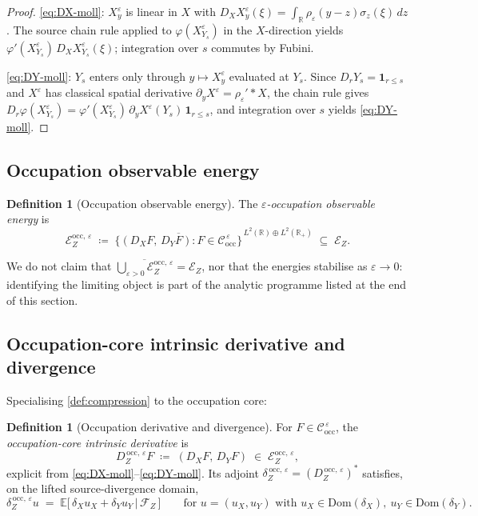 \documentclass[11pt,reqno]{amsart}
\theoremstyle{plain}
\theoremstyle{definition}
\newtheorem{definition}[theorem]{Definition}
\theoremstyle{remark}
\newcommand{\R}{\mathbb{R}}
\newcommand{\E}{\mathbb{E}}
\newcommand{\Dom}{\mathrm{Dom}}
\newcommand{\Energy}{\mathcal{E}}
\newcommand{\IBM}{Z}
\begin{document}
\begin{proof}
\eqref{eq:DX-moll}: $X^\varepsilon_y$ is linear in $X$ with
$D_XX^\varepsilon_y(\xi)=\int_\R\rho_\varepsilon(y-z)\sigma_z(\xi)\,dz$.
The source chain rule applied to $\varphi(X^\varepsilon_{Y_s})$ in the
$X$-direction yields $\varphi'(X^\varepsilon_{Y_s})\,D_XX^\varepsilon_{Y_s}(\xi)$;
integration over $s$ commutes by Fubini.

\eqref{eq:DY-moll}: $Y_s$ enters only through $y\mapsto X^\varepsilon_y$
evaluated at $Y_s$. Since $D_rY_s=\mathbf 1_{r\le s}$ and $X^\varepsilon$
has classical spatial derivative
$\partial_yX^\varepsilon=\rho_\varepsilon'*X$, the chain rule gives
$D_r\varphi(X^\varepsilon_{Y_s})=\varphi'(X^\varepsilon_{Y_s})\,
\partial_yX^\varepsilon(Y_s)\,\mathbf 1_{r\le s}$, and integration over
$s$ yields \eqref{eq:DY-moll}.
\end{proof}

\subsection*{Occupation observable energy}

\begin{definition}[Occupation observable energy]\label{def:occ-energy}
The \emph{$\varepsilon$-occupation observable energy} is
\[
  \Energy_\IBM^{\mathrm{occ},\,\varepsilon}
  \;\coloneqq\;
  \overline{\bigl\{(D_XF,\,D_YF):F\in\mathcal C_{\mathrm{occ}}^{\,\varepsilon}\bigr\}}
  ^{\,L^{2}(\R)\oplus L^{2}(\R_{+})}
  \;\subseteq\;\Energy_\IBM.
\]
\end{definition}

We do not claim that
$\overline{\bigcup_{\varepsilon>0}\Energy_\IBM^{\mathrm{occ},\,\varepsilon}}
=\Energy_\IBM$, nor that the energies stabilise as $\varepsilon\to 0$:
identifying the limiting object is part of the analytic programme
listed at the end of this section.

\subsection*{Occupation-core intrinsic derivative and divergence}

Specialising \cref{def:compression} to the occupation core:

\begin{definition}[Occupation derivative and divergence]
\label{def:ibm-occ-D}
For $F\in\mathcal C_{\mathrm{occ}}^{\,\varepsilon}$, the
\emph{occupation-core intrinsic derivative} is
\[
  D_\IBM^{\,\mathrm{occ},\,\varepsilon} F
  \;\coloneqq\;(D_X F,\,D_Y F)\;\in\;\Energy_\IBM^{\mathrm{occ},\,\varepsilon},
\]
explicit from \eqref{eq:DX-moll}--\eqref{eq:DY-moll}. Its adjoint
$\delta_\IBM^{\,\mathrm{occ},\,\varepsilon}=
(D_\IBM^{\,\mathrm{occ},\,\varepsilon})^{*}$
satisfies, on the lifted source-divergence domain,
\begin{equation}\label{eq:occ-delta}
  \delta_\IBM^{\,\mathrm{occ},\,\varepsilon} u
  \;=\;\E\!\bigl[\,\delta_X u_X+\delta_Y u_Y\,\big|\,\mathcal F_\IBM\,\bigr]
  \qquad\text{for }u=(u_X,u_Y)
  \text{ with }u_X\in\Dom(\delta_X),\ u_Y\in\Dom(\delta_Y).
\end{equation}
\end{definition}
\end{document}
